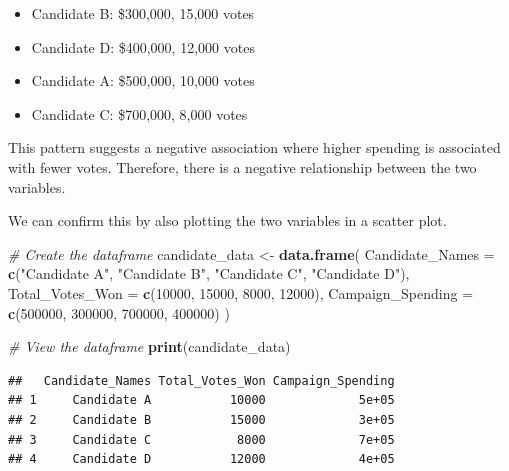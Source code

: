 \documentclass[
  11pt,
]{article}
\newenvironment{Shaded}{\begin{snugshade}}{\end{snugshade}}
\newcommand{\AttributeTok}[1]{\textcolor[rgb]{0.13,0.29,0.53}{#1}}
\newcommand{\CommentTok}[1]{\textcolor[rgb]{0.56,0.35,0.01}{\textit{#1}}}
\newcommand{\DecValTok}[1]{\textcolor[rgb]{0.00,0.00,0.81}{#1}}
\newcommand{\FunctionTok}[1]{\textcolor[rgb]{0.13,0.29,0.53}{\textbf{#1}}}
\newcommand{\NormalTok}[1]{#1}
\newcommand{\OtherTok}[1]{\textcolor[rgb]{0.56,0.35,0.01}{#1}}
\newcommand{\StringTok}[1]{\textcolor[rgb]{0.31,0.60,0.02}{#1}}
\providecommand{\tightlist}{%
  \setlength{\itemsep}{0pt}\setlength{\parskip}{0pt}}
\begin{document}
\begin{itemize}
\tightlist
\item
  Candidate B: \$300,000, 15,000 votes
\item
  Candidate D: \$400,000, 12,000 votes
\item
  Candidate A: \$500,000, 10,000 votes
\item
  Candidate C: \$700,000, 8,000 votes
\end{itemize}

This pattern suggests a negative association where higher spending is
associated with fewer votes. Therefore, there is a negative relationship
between the two variables.

We can confirm this by also plotting the two variables in a scatter
plot.

\begin{Shaded}
\begin{Highlighting}[]
\CommentTok{\# Create the dataframe}
\NormalTok{candidate\_data }\OtherTok{\textless{}{-}} \FunctionTok{data.frame}\NormalTok{(}
  \AttributeTok{Candidate\_Names =} \FunctionTok{c}\NormalTok{(}\StringTok{"Candidate A"}\NormalTok{, }\StringTok{"Candidate B"}\NormalTok{, }\StringTok{"Candidate C"}\NormalTok{, }
                      \StringTok{"Candidate D"}\NormalTok{),}
  \AttributeTok{Total\_Votes\_Won =} \FunctionTok{c}\NormalTok{(}\DecValTok{10000}\NormalTok{, }\DecValTok{15000}\NormalTok{, }\DecValTok{8000}\NormalTok{, }\DecValTok{12000}\NormalTok{),}
  \AttributeTok{Campaign\_Spending =} \FunctionTok{c}\NormalTok{(}\DecValTok{500000}\NormalTok{, }\DecValTok{300000}\NormalTok{, }\DecValTok{700000}\NormalTok{, }\DecValTok{400000}\NormalTok{)}
\NormalTok{)}

\CommentTok{\# View the dataframe}
\FunctionTok{print}\NormalTok{(candidate\_data)}
\end{Highlighting}
\end{Shaded}

\begin{verbatim}
##   Candidate_Names Total_Votes_Won Campaign_Spending
## 1     Candidate A           10000             5e+05
## 2     Candidate B           15000             3e+05
## 3     Candidate C            8000             7e+05
## 4     Candidate D           12000             4e+05
\end{verbatim}
\end{document}
